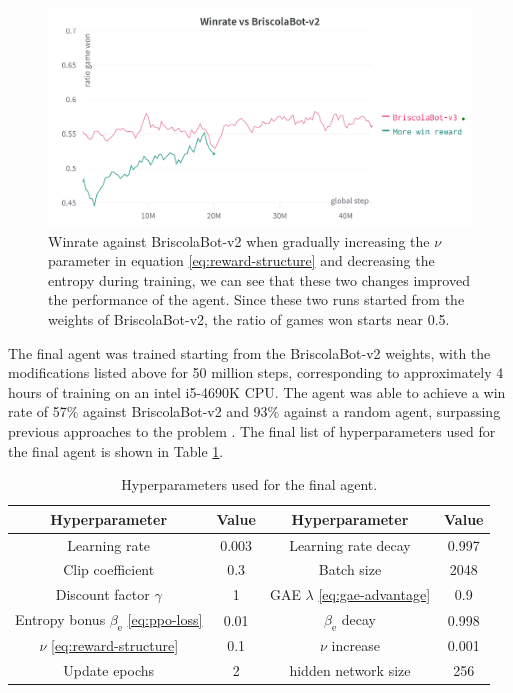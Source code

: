 \begin{figure}[H]
    \centering
    \includegraphics[width=\textwidth]{images/briscolabot-v3.png}
    \caption{Winrate against BriscolaBot-v2 when gradually increasing the $\nu$ parameter in equation \eqref{eq:reward-structure} and decreasing the entropy during training, we can see that these two changes improved the performance of the agent. Since these two runs started from the weights of BriscolaBot-v2, the ratio of games won starts near 0.5.}
    \label{fig:briscolabot-v3}
\end{figure}

The final agent was trained starting from the BriscolaBot-v2 weights, with the modifications listed above for 50 million steps, corresponding to approximately 4 hours of training on an intel i5-4690K CPU. The agent was able to achieve a win rate of 57\% against BriscolaBot-v2 and 93\% against a random agent, surpassing previous approaches to the problem \cite{alsora-deep-briscola-dqn}. The final list of hyperparameters used for the final agent is shown in Table \ref{tab:hyperparam-final}.

\begin{table}[H]
    \centering
    \begin{tabular}{cccc}
        \hline
        Hyperparameter & Value & Hyperparameter & Value \\
        \hline
        Learning rate & 0.003 & Learning rate decay & 0.997 \\
        Clip coefficient & 0.3 & Batch size & 2048 \\
        Discount factor $\gamma$ & 1 & GAE $\lambda$ \eqref{eq:gae-advantage} & 0.9 \\
        Entropy bonus $\beta_\textrm{e}$ \eqref{eq:ppo-loss} & 0.01 & $\beta_\textrm{e}$ decay & 0.998 \\
        $\nu$ \eqref{eq:reward-structure} & 0.1 & $\nu$ increase & 0.001 \\
        Update epochs & 2 & hidden network size & 256
    \end{tabular}
    \caption{Hyperparameters used for the final agent.}
    \label{tab:hyperparam-final}
\end{table}

